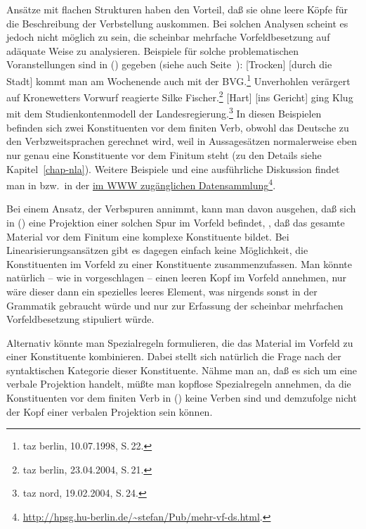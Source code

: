 Ansätze mit flachen Strukturen haben den Vorteil, daß sie ohne leere Köpfe für die Beschreibung der
Verbstellung auskommen. Bei solchen Analysen scheint es jedoch nicht möglich zu sein, die scheinbar
mehrfache Vorfeldbesetzung \citep{Mueller2005d} auf adäquate Weise zu analysieren. Beispiele für
solche problematischen Voranstellungen sind in () gegeben (siehe auch Seite~\pageref{bsp-mehr-vf}):
\eal
\label{bsp-smvfb}
\ex {}[Trocken] [durch die Stadt] kommt man am Wochenende auch mit der BVG.\footnote{
        taz berlin, 10.07.1998, S.\,22.
      }
\ex Unverhohlen verärgert auf Kronewetters Vorwurf reagierte Silke Fischer.\footnote{
    taz berlin, 23.04.2004, S.\,21.
}
\ex {}[Hart] [ins Gericht] ging Klug mit dem Studienkontenmodell der Landesregierung.\footnote{
  taz nord, 19.02.2004, S.\,24.
  }
\zl
In diesen Beispielen befinden sich zwei Konstituenten vor dem finiten Verb, obwohl das Deutsche
zu den Verbzweitsprachen gerechnet wird, weil in Aussagesätzen
normalerweise eben nur genau eine Konstituente vor dem Finitum steht (zu den Details siehe Kapitel~\ref{chap-nla}).
Weitere Beispiele und eine ausführliche Diskussion findet man in 
bzw.\ in der \href{http://hpsg.hu-berlin.de/~stefan/Pub/mehr-vf-ds.html}{im WWW zugänglichen Datensammlung}\footnote{
  \url{http://hpsg.hu-berlin.de/~stefan/Pub/mehr-vf-ds.html}.%
}.

Bei einem Ansatz, der Verbspuren annimmt, kann man davon ausgehen, daß sich in () eine Projektion
einer solchen Spur im Vorfeld befindet, \dash, daß das gesamte Material vor dem Finitum eine komplexe Konstituente
bildet. Bei Linearisierungsansätzen gibt es dagegen einfach keine Möglichkeit, 
die Konstituenten im Vorfeld zu einer Konstituente zusammenzufassen. Man
könnte natürlich -- wie in  vorgeschlagen 
-- einen leeren Kopf im Vorfeld annehmen, nur wäre dieser dann ein spezielles leeres Element,
was nirgends sonst in der Grammatik gebraucht würde
und nur zur Erfassung der scheinbar mehrfachen Vorfeldbesetzung stipuliert würde.

Alternativ könnte man Spezialregeln formulieren, die das Material
im Vorfeld zu einer Konstituente kombinieren. Dabei stellt sich natürlich die Frage nach
der syntaktischen Kategorie dieser Konstituente. Nähme man an, daß es sich um eine verbale
Projektion handelt, müßte man kopflose Spezialregeln annehmen, da die Konstituenten vor dem finiten
Verb in () keine Verben sind und demzufolge nicht der Kopf einer verbalen Projektion sein
können.

